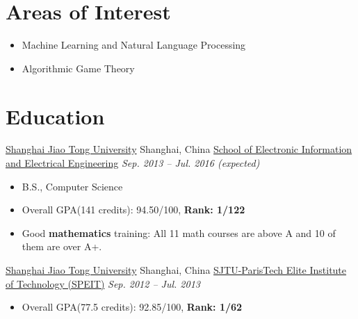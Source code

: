 \documentclass[letterpaper,12pt]{resume}
\author{Xinya Du}
\begin{document}
\resumeheader



\section{Areas of Interest}

\begin{itemize}
\item Machine Learning and Natural Language Processing 
\item Algorithmic Game Theory%
\end {itemize}



\section{Education}
\begin{itemize}
   \credential
    {\href{http://en.sjtu.edu.cn/}{Shanghai Jiao Tong University}}
    {Shanghai, China}
    {\href{http://english.seiee.sjtu.edu.cn/}{School of Electronic Information and Electrical Engineering}}
    {\textit{Sep. 2013 -- Jul. 2016 (expected)}}
    { 
    \begin{itemize}
      \item{B.S., Computer Science}%
      \item{Overall GPA(141 credits): 94.50/100, \textbf{Rank: 1/122}}
      \item{Good \textbf{mathematics} training: All 11 math courses are above A and 10 of them are over A+.}
      \end{itemize}
    }
     \credential
    {\href{http://en.sjtu.edu.cn/}{Shanghai Jiao Tong University}}
   {Shanghai, China}
    {\href{http://speit.sjtu.edu.cn/indexen.html}{SJTU-ParisTech Elite Institute of Technology (SPEIT)}}
    {\textit{Sep. 2012 -- Jul. 2013}}
    { 
    \begin{itemize}
      \item{Overall GPA(77.5 credits): 92.85/100, \textbf{Rank: 1/62}}
      \end{itemize}
    }
\end{itemize}
\end{document}
